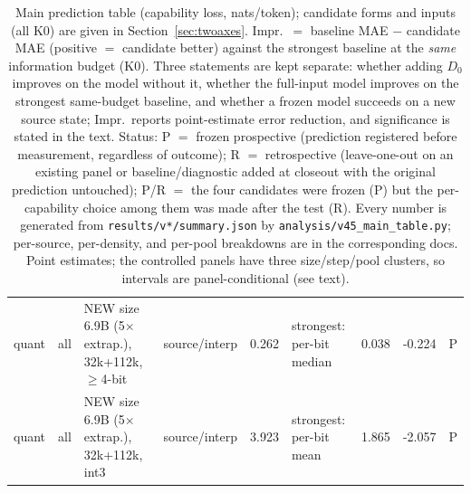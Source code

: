 \begin{table}
\begin{tabular}{@{}llp{4.6cm}lrp{3.2cm}rrl@{}}
\midrule
quant & all & NEW size 6.9B (5$\times$ extrap.), 32k+112k, $\ge$4-bit & source/interp & 0.262 & strongest: per-bit median & 0.038 & -0.224 & P \\
quant & all & NEW size 6.9B (5$\times$ extrap.), 32k+112k, int3 & source/interp & 3.923 & strongest: per-bit mean & 1.865 & -2.057 & P \\
\bottomrule
\end{tabular}
\caption{Main prediction table (capability loss, nats/token); candidate forms and inputs (all K0) are given in Section~\ref{sec:twoaxes}. Impr.\ $=$ baseline MAE $-$ candidate MAE (positive $=$ candidate better) against the strongest baseline at the \emph{same} information budget (K0). Three statements are kept separate: whether adding $D_0$ improves on the model without it, whether the full-input model improves on the strongest same-budget baseline, and whether a frozen model succeeds on a new source state; Impr.\ reports point-estimate error reduction, and significance is stated in the text. Status: P $=$ frozen prospective (prediction registered before measurement, regardless of outcome); R $=$ retrospective (leave-one-out on an existing panel or baseline/diagnostic added at closeout with the original prediction untouched); P/R $=$ the four candidates were frozen (P) but the per-capability choice among them was made after the test (R). Every number is generated from \texttt{results/v*/summary.json} by \texttt{analysis/v45\_main\_table.py}; per-source, per-density, and per-pool breakdowns are in the corresponding docs. Point estimates; the controlled panels have three size/step/pool clusters, so intervals are panel-conditional (see text).}
\label{tab:main}
\end{table}
